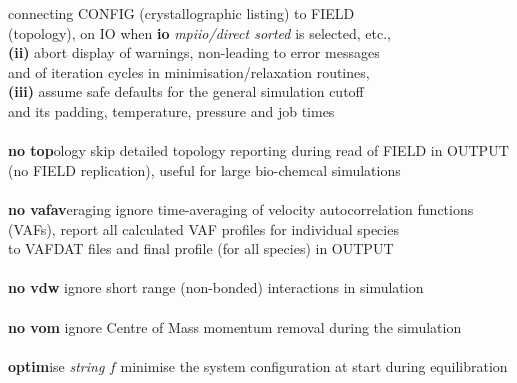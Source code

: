 \begin{tabbing}
\>                                              \> connecting CONFIG (crystallographic listing) to FIELD \\
\>                                              \> (topology), on IO when {\bf io} {\em mpiio/direct sorted} is selected, etc., \\
\>                                              \> {\bf (ii)} abort display of warnings, non-leading to error messages \\
\>                                              \> and of iteration cycles in minimisation/relaxation routines, \\
\>                                              \> {\bf (iii)} assume safe defaults for the general simulation cutoff \\
\>                                              \> and its padding, temperature, pressure and job times \\
\>                                              \> \\
\> {\bf no top}ology                            \> skip detailed topology reporting during read of FIELD in OUTPUT \\
\>                                              \> (no FIELD replication), useful for large bio-chemcal simulations \\
\>                                              \> \\
\> {\bf no vafav}eraging                        \> ignore time-averaging of velocity autocorrelation functions \\
\>                                              \> (VAFs), report all calculated VAF profiles for individual species \\
\>                                              \> to VAFDAT files and final profile (for all species) in OUTPUT \\
\>                                              \> \\
\> {\bf no vdw}                                 \> ignore short range (non-bonded) interactions in simulation \\
\>                                              \> \\
\> {\bf no vom}                                 \> ignore Centre of Mass momentum removal during the simulation \\
\>                                              \> \\
\> {\bf optim}ise {\em string} $f$              \> minimise the system configuration at start during equilibration \\

\end{tabbing}

